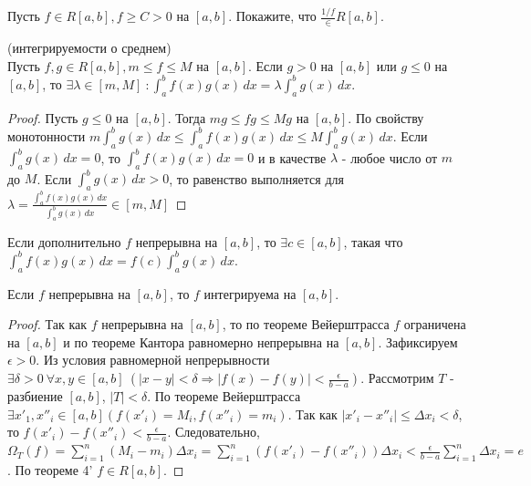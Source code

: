 \begin{problem}
    Пусть $f \in R[a, b], f \geq C > 0$ на $[a, b]$.
    Покажите, что $\frac{1/f} \in R[a, b]$.
\end{problem}

\begin{theorem} (интегрируемости о среднем)\\
    Пусть $f, g \in R[a, b], m \leq f \leq M$ на $[a, b]$.
    Если $g > 0$ на $[a, b]$ или $g \leq 0$ на $[a, b]$, то
    $\exists \lambda \in [m, M] \ : \int_a^b f(x)g(x) \,dx = \lambda \int_a^b g(x) \,dx$.
\end{theorem}

\begin{proof}
    Пусть $g \leq 0$ на $[a, b]$.  Тогда $mg \leq fg \leq Mg$ на $[a, b]$.
    По свойству монотонности $m \int_a^b g(x) \,dx \leq \int_a^b f(x)g(x) \,dx \leq M \int_a^b g(x) \,dx$.
    Если $\int_a^b g(x) \,dx = 0$, то $\int_a^b f(x)g(x) \,dx = 0$ и в качестве $\lambda$ - любое число от $m$ до $M$.
    Если $\int_a^b g(x) \,dx > 0$, то равенство выполняется для
    \(\lambda = \frac{\int_a^b f(x)g(x) \,dx}{\int_a^b g(x) \,dx} \in [m, M]\)
\end{proof}

\begin{corollary}
    Если дополнительно $f$ непрерывна на $[a, b]$, то $\exists c \in [a, b]$, такая что
    \(\int_a^b f(x)g(x) \,dx = f(c) \int_a^b g(x) \,dx\).
\end{corollary}

\begin{theorem}
    Если $f$ непрерывна на $[a, b]$, то $f$ интегрируема на $[a, b]$.
\end{theorem}

\begin{proof}
    Так как $f$ непрерывна на $[a, b]$, то по теореме Вейерштрасса $f$ ограничена на $[a, b]$
    и по теореме Кантора равномерно непрерывна на $[a, b]$.
    Зафиксируем $\epsilon > 0$. Из условия равномерной непрерывности
    $\exists \delta > 0 \ \forall x, y \in [a, b] \ (|x - y| < \delta \Rightarrow |f(x) - f(y)| < \frac{\epsilon}{b-a})$. Рассмотрим $T$ - разбиение $[a, b]$, $|T| < \delta$. По теореме Вейерштрасса
    $\exists x'_1, x''_i \in [a, b] (f(x'_i) = M_i, f(x''_i) = m_i)$.
    Так как $|x'_i - x''_i| \leq \Delta x_i < \delta$, то $f(x'_i) - f(x''_i) < \frac{\epsilon}{b-a}$.
    Следовательно, \(\Omega_T(f) = \sum_{i = 1}^n(M_i - m_i)\Delta x_i = 
    \sum_{i = 1}^n(f(x'_i) - f(x''_i))\Delta x_i < \frac{\epsilon}{b-a}\sum_{i = 1}^n \Delta x_i = e\).
    По теореме 4' $f \in R[a, b]$.
\end{proof}

